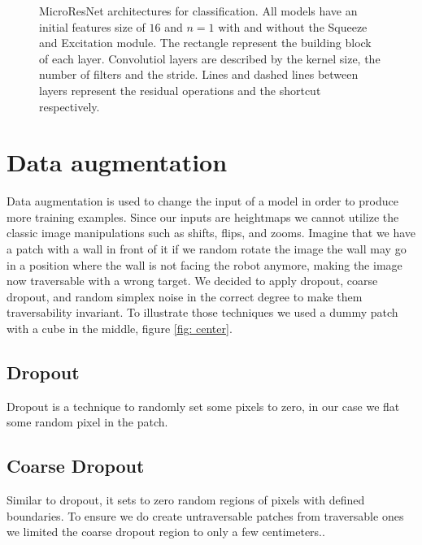 \documentclass[../document.tex]{subfiles}
\begin{document}
\begin{figure}[htbp]
\begin{subfigure}[b]{0.22\textwidth}
        \caption{}
    \end{subfigure} 
    \caption{MicroResNet architectures for classification. All models have an initial features size of $16$ and $n=1$ with and without the Squeeze and Excitation module. The rectangle represent the building block of each layer. Convolutiol layers are described by the kernel size, the number of filters and the stride. Lines and dashed lines between layers represent the residual operations and the shortcut respectively.}
    \label{fig : microresnet}
\end{figure}

\section{Data augmentation}
\label{sec: data-aug}
Data augmentation is used to change the input of a model in order to produce more training examples. Since our inputs are heightmaps we cannot utilize the classic image manipulations such as shifts, flips, and zooms. Imagine that we have a patch with a wall in front of it if we random rotate the image the wall may go in a position where the wall is not facing the robot anymore, making the image now traversable with a wrong target. We decided to apply dropout, coarse dropout, and random simplex noise in the correct degree to make them traversability invariant. To illustrate those techniques we used a dummy patch with a cube in the middle, figure \ref{fig: center}.

\subsection{Dropout}
Dropout is a technique to randomly set some pixels to zero, in our case we flat some random pixel in the patch. 
\subsection{Coarse Dropout}
Similar to dropout, it sets to zero random regions of pixels with defined boundaries.  To ensure we do create untraversable patches from traversable ones we limited the coarse dropout region to only a few centimeters..
\end{document}
